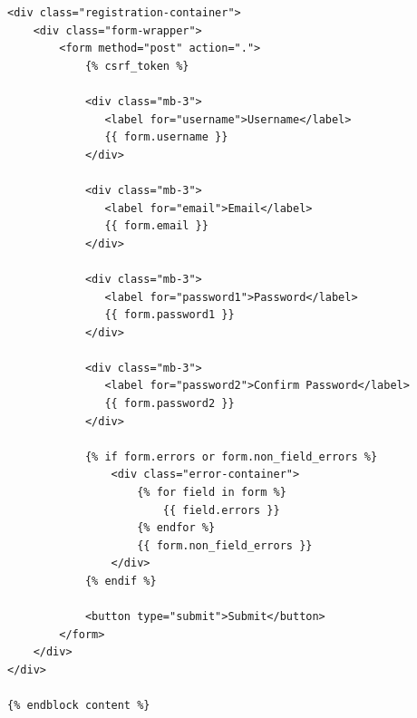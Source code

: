 \begin{verbatim}
<div class="registration-container">
    <div class="form-wrapper">
        <form method="post" action=".">
            {% csrf_token %}
            
            <div class="mb-3">
               <label for="username">Username</label>
               {{ form.username }}
            </div>

            <div class="mb-3">
               <label for="email">Email</label>
               {{ form.email }}
            </div>

            <div class="mb-3">
               <label for="password1">Password</label>
               {{ form.password1 }}
            </div>

            <div class="mb-3">
               <label for="password2">Confirm Password</label>
               {{ form.password2 }}
            </div>

            {% if form.errors or form.non_field_errors %}
                <div class="error-container">
                    {% for field in form %}
                        {{ field.errors }}
                    {% endfor %}
                    {{ form.non_field_errors }}
                </div>
            {% endif %}

            <button type="submit">Submit</button>
        </form>
    </div>
</div>

{% endblock content %}

\end{verbatim}
